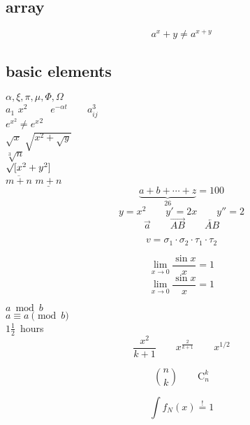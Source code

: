 \documentclass[a4paper, 11pt]{article}
\begin{document}
\subsection{array}
\begin{equation}
a^x + y \neq a^{x+y} 
\end{equation}

\subsection{basic elements}
$\alpha, \xi, \pi, \mu, \Phi, \Omega $ \\
$a_{1}$ \qquad $x^{2} \qquad$ $e^{-\alpha t} \qquad a_{ij}^{3}$\\
$e^{x^2} \neq {e^x}^{2}$ \\

\(\sqrt{x}\) \qquad \(\sqrt{x^{2} + \sqrt{y}}\) \\
$\sqrt[3]{n}$ \\ [3pt]
$\surd[x^2 + y^2]$\\

$\overline{m+n}$ \qquad $\underline{m+n}$ \\
\begin{displaymath}
\underbrace{a + b + \cdots +z}_{26}=100
\end{displaymath}
\begin{displaymath}
y=x^2 \qquad y' = 2x\qquad y''=2
\end{displaymath}
\[\vec{a}\qquad\overrightarrow{AB}\qquad\overleftarrow{AB}\]

\begin{displaymath}
v = {\sigma}_1 \cdot {\sigma}_2 \cdot {\tau}_1 \cdot {\tau}_2
\end{displaymath}

\[\lim_{x \to 0}\frac{\sin x}{x} = 1\]
\[\lim_{x \rightarrow 0}\frac{\sin x}{x} = 1\]

$a\bmod b $\\
$a \equiv a \pmod{b}$\\

$1\frac{1}{2}$~hours
\begin{displaymath}
\frac{x^2}{k+1}\qquad x^{\frac{2}{k+1}}\qquad x^{1/2}
\end{displaymath}

\begin{displaymath}
\binom{n}{k} \qquad \mathrm{C}_n^k
\end{displaymath}

\begin{displaymath}
\int f_N(x) \stackrel{!}{=} 1
\end{displaymath}
\end{document}

